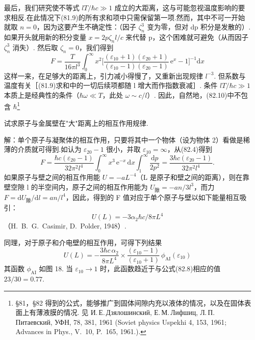 最后，我们研究使不等式 $lT/\hbar c\gg 1$ 成立的大距离，这与可能忽视温度影响的要求相反.在此情况下(81.9)的所有求和项中只需保留第一项.然而，其中不可一开始就取 $n=0$，因为这要产生不确定性：（因子 $\zeta_n^{3}$ 变为零，但对 dp 积分是发散的）. 如果开头就用新的积分变量 $x=2p\zeta_n l/c$ 来代替 p，这个困难就可避免（从而因子 $\zeta_n^{3}$ 消失）. 然后取 $\zeta_n=0$，我们得到
\begin{equation}
  F=\frac{T}{16\pi l^{3}}\int_{0}^{\infty}x^{2}\biggl[\frac{(\varepsilon_{10}+1)(\varepsilon_{20}+1)}{(\varepsilon_{10}-1)(\varepsilon_{20}-1)}\,\mathrm{e}^{x}-1\biggr]^{-1}\mathrm{d}x
\end{equation}
这样一来，在足够大的距离上，引力减小得慢了，又重新出现规律 $l^{-3}$. 但系数与温度有关［(81.9)求和中的一切后续项都随 l 增大而作指数衰减］. 条件 $lT/\hbar c\gg 1$ 本质上是经典性的条件（$\hbar\omega\ll T$，此处 $\omega\sim c/l$）. 因此，自然地，(82.10)中不包含 $\hbar$\footnote{§81，§82 得到的公式，能够推广到固体间隙内充以液体的情况，以及在固体表面上有薄液膜的情况. 见 И.\,Е.\,Дзялошинский, Е.\,М.\,Лифшиц, Л.\,П.\,Питаевский, УФН, 78, 381, 1961 (Soviet physics Uspekhi 4, 153, 1961; Advances in Phys., V.~10, P.~165, 1961.).}

\begin{xiti}

试求原子与金属壁在"大"距离上的相互作用规律.

{\heiti 解：}单个原子与凝聚体的相互作用，只要将其中一个物体（设为物体 2）看做是稀薄的介质就可得到.如认为 $\varepsilon_{20}-1$ 很小，并取 $\varepsilon_{10}=\infty$，从(82.4)得到
\begin{equation}\tag{1}
  F=\frac{\hbar c(\varepsilon_{20}-1)}{32\pi^{2}l^{4}}\int_{0}^{\infty}x^{3}\,\mathrm{e}^{-x}\,\mathrm{d}x\int_{1}^{\infty}\frac{\mathrm{d}p}{2p^{2}}=\frac{3\hbar c(\varepsilon_{20}-1)}{32\pi^{2}l^{4}}.
\end{equation}
如果原子与壁之间的相互作用能 $U=-aL^{-4}$（L 是原子和壁之间的距离），则在靠壁空隙 l 的半空间内，原子之间的相互作用能为 $U_{\text{隙}}=-an/3l^{3}$，而力 $F=\mathrm{d}U_{\text{隙}}/\mathrm{d}l=an/l^{4}$，因此，得到的 F 值对应于单个原子与壁以如下能量相互吸引：
\begin{equation}\tag{2}
  U(L)=-3\alpha_2\hbar c/8\pi L^{4}
\end{equation}
（H.~B.~G.~Casimir, D.~Polder, 1948）.

同理，对于原子和介电壁的相互作用，可得下列结果
\begin{equation*}
  U(L)=-\frac{3\hbar c\,\alpha_2}{8\pi L^{4}}\times\frac{(\varepsilon_{10}-1)}{(\varepsilon_{10}+1)}\,\phi_{\mathrm{AI}}(\varepsilon_{10})
\end{equation*}
其函数 $\phi_{\mathrm{AI}}$ 如图 18. 当 $\varepsilon_{10}\to 1$ 时，此函数趋近于与公式(82.8)相应的值 $23/30=0.77$.

\end{xiti}

